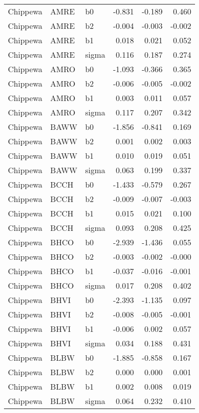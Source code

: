 \begin{table}[ht]
\begin{center}
\begin{tabular}{lllrrr}
  Chippewa & AMRE & b0 & -0.831 & -0.189 & 0.460 \\ 
  Chippewa & AMRE & b2 & -0.004 & -0.003 & -0.002 \\ 
  Chippewa & AMRE & b1 & 0.018 & 0.021 & 0.052 \\ 
  Chippewa & AMRE & sigma & 0.116 & 0.187 & 0.274 \\ 
  Chippewa & AMRO & b0 & -1.093 & -0.366 & 0.365 \\ 
  Chippewa & AMRO & b2 & -0.006 & -0.005 & -0.002 \\ 
  Chippewa & AMRO & b1 & 0.003 & 0.011 & 0.057 \\ 
  Chippewa & AMRO & sigma & 0.117 & 0.207 & 0.342 \\ 
  Chippewa & BAWW & b0 & -1.856 & -0.841 & 0.169 \\ 
  Chippewa & BAWW & b2 & 0.001 & 0.002 & 0.003 \\ 
  Chippewa & BAWW & b1 & 0.010 & 0.019 & 0.051 \\ 
  Chippewa & BAWW & sigma & 0.063 & 0.199 & 0.337 \\ 
  Chippewa & BCCH & b0 & -1.433 & -0.579 & 0.267 \\ 
  Chippewa & BCCH & b2 & -0.009 & -0.007 & -0.003 \\ 
  Chippewa & BCCH & b1 & 0.015 & 0.021 & 0.100 \\ 
  Chippewa & BCCH & sigma & 0.093 & 0.208 & 0.425 \\ 
  Chippewa & BHCO & b0 & -2.939 & -1.436 & 0.055 \\ 
  Chippewa & BHCO & b2 & -0.003 & -0.002 & -0.000 \\ 
  Chippewa & BHCO & b1 & -0.037 & -0.016 & -0.001 \\ 
  Chippewa & BHCO & sigma & 0.017 & 0.208 & 0.402 \\ 
  Chippewa & BHVI & b0 & -2.393 & -1.135 & 0.097 \\ 
  Chippewa & BHVI & b2 & -0.008 & -0.005 & -0.001 \\ 
  Chippewa & BHVI & b1 & -0.006 & 0.002 & 0.057 \\ 
  Chippewa & BHVI & sigma & 0.034 & 0.188 & 0.431 \\ 
  Chippewa & BLBW & b0 & -1.885 & -0.858 & 0.167 \\ 
  Chippewa & BLBW & b2 & 0.000 & 0.000 & 0.001 \\ 
  Chippewa & BLBW & b1 & 0.002 & 0.008 & 0.019 \\ 
  Chippewa & BLBW & sigma & 0.064 & 0.232 & 0.410 \\ 

\end{tabular}
\end{center}
\end{table}
